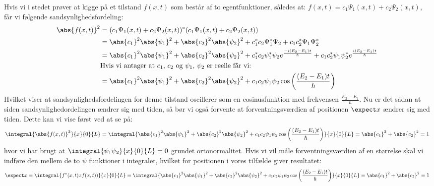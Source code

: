 Hvis vi i stedet prøver at kigge på et tilstand $f(x,t)$ som består af to egentfunktioner, således at: $f(x,t)=c_1\Psi_1(x,t)+c_2\Psi_2(x,t)$, får vi følgende sandsynlighedsfordeling:
\begin{align*}
    \abs{f(x,t)}^2&=(c_1\Psi_1(x,t)+c_2\Psi_2(x,t))^{*}(c_1\Psi_1(x,t)+c_2\Psi_2(x,t))\\
    &=\abs{c_1}^{2}\abs{\psi_1}^{2}+\abs{c_2}^{2}\abs{\psi_2}^{2}+c_1^{*}c_2\Psi_1^{*}\Psi_2+c_1c_2^{*}\Psi_1\Psi_2^{*}\\
    &=\abs{c_1}^{2}\abs{\psi_1}^{2}+\abs{c_2}^{2}\abs{\psi_2}^{2}+c_1^{*}c_2\psi_1^{*}\psi_2e^{\frac{-i(E_2-E_1)t}{\hbar}}+c_1c_2^{*}\psi_1\psi_2^{*}e^{\frac{i(E_2-E_1)t}{\hbar}}\\
    &\text{Hvis vi antager at $c_1$, $c_2$ og $\psi_1$, $\psi_2$ er reelle får vi:}\\
    &=\abs{c_1}^{2}\abs{\psi_1}^{2}+\abs{c_2}^{2}\abs{\psi_2}^{2}+c_1c_2\psi_1\psi_2\cos\left(\frac{(E_2-E_1)t}{\hbar}\right)
\end{align*}
Hvilket viser at sandsynlighedsfordelingen for denne tilstand oscillerer som en cosinusfunktion med frekvensen $\frac{E_2-E_1}{\hbar}$. Nu er det sådan at siden sandsynlighedordelingen ændrer sig med tiden, så bør vi også forvente at forventningsværdien af positionen $\expect x$ ændrer sig med tiden. Dette kan vi vise først ved at se på:
\begin{equation*}
    \integral{\abs{f(x,t)}^2}{x}{0}{L}=\integral{\abs{c_1}^{2}\abs{\psi_1}^{2}+\abs{c_2}^{2}\abs{\psi_2}^{2}+c_1c_2\psi_1\psi_2\cos\left(\frac{(E_2-E_1)t}{\hbar}\right)}{x}{0}{L}=\abs{c_1}^2+\abs{c_2}^2=1
\end{equation*}
hvor vi har brugt at $\integral{\psi_1\psi_2}{x}{0}{L}=0$ grundet ortonormalitet. Hvis vi vil måle forventningsværdien af en størrelse skal vi indføre den mellem de to $\psi$ funktioner i integralet, hvilket for positionen i vores tilfælde giver resultatet:
\begin{align*}
    \expect x=\integral{f^*(x,t)xf(x,t))}{x}{0}{L}=\integral{\abs{c_1}^{2}\abs{\psi_1}^{2}+\abs{c_2}^{2}\abs{\psi_2}^{2}+c_1c_2\psi_1\psi_2\cos\left(\frac{(E_2-E_1)t}{\hbar}\right)}{x}{0}{L}=\abs{c_1}^2+\abs{c_2}^2=1
\end{align*}